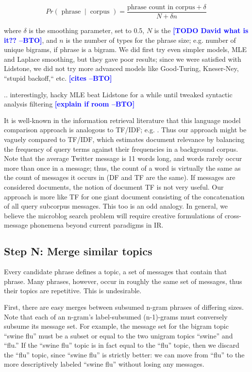 \documentclass[letterpaper]{article}
\newcommand{\bto}[1]{\textcolor{blue}{\textbf{[#1 --BTO]}}}
\newcommand{\codenote}[1]{}
\begin{document}
\[ Pr(\textrm{ phrase }\ |\ \textrm{ corpus }) = \frac
{ \textrm{phrase count in corpus} + \delta }
{ N + \delta n   }
\]

where $\delta$ is the smoothing parameter, set to 0.5, $N$ is the \bto{TODO David what is it??}, and $n$ is the number of types for the phrase size; e.g. number of unique bigrams, if phrase is a bigram.  We did first try even simpler models, MLE and Laplace smoothing, but they gave poor results; since we were satisfied with Lidstone, we did not try more advanced models like Good-Turing, Kneser-Ney, ``stupid backoff,`` etc. \bto{cites}

.. interestingly, hacky MLE beat Lidstone for a while until tweaked syntactic analysis filtering \bto{explain if room}

It is well-known in the information retrieval literature that this  language model comparison approach is analogous to TF/IDF; e.g. \cite{manning_introduction_2008}.  Thus our approach might be vaguely compared to TF/IDF, which estimates document relevance by balancing the frequency of query terms against their frequencies in a background corpus.  Note that the average Twitter message is 11 words long, and words rarely occur more than once in a message; thus, the count of a word is virtually the same as the count of messages it occurs in (DF and TF are the same).  If messages are considered documents, the notion of document TF is not very useful.  Our approach is more like TF for one giant document consisting of the concatenation of all query subcorpus messages.  This too is an odd analogy.  In general, we believe the microblog search problem will require creative formulations of cross-message phonemena beyond current paradigms in IR.

\subsection{Step N: Merge similar topics}

\codenote{ deduper.py }
Every candidate phrase defines a topic, a set of messages that contain that phrase.  Many phrases, however, occur in roughly the same set of messages, thus their topics are repetitive.  This is undesirable.

First, there are easy merges between subsumed n-gram phrases of differing sizes.  Note that each of an n-gram's label-subsumed (n-1)-grams must conversely subsume its message set.  For example, the message set for the bigram topic ``swine flu'' must be a subset or equal to the two unigram topics ``swine'' and ``flu.''  If the ``swine flu'' topic is in fact equal to the ``flu'' topic, then we discard the ``flu'' topic, since ``swine flu'' is strictly better: we can move from ``flu'' to the more descriptively labeled ``swine flu'' without losing any messages.
\end{document}
